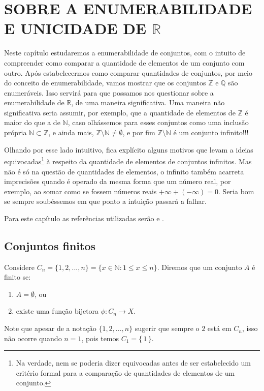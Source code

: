 \documentclass[../main.tex]{subfiles}
\makeatletter
\newcounter{saveenumerate}
\newcommand{\enumeratext}[1]{%
\setcounter{saveenumerate}{\value{enum\romannumeral\the\@enumdepth}}
\end{enumerate}
#1
\begin{enumerate}
\setcounter{enum\romannumeral\the\@enumdepth}{\value{saveenumerate}}%
}
\makeatother
\begin{document}
\chapter{SOBRE A ENUMERABILIDADE E UNICIDADE DE $\mathbb{R}$ }\label{cap-enumerabilidade}

Neste capítulo estudaremos a enumerabilidade de conjuntos, com o intuito de compreender como comparar a quantidade de elementos de um conjunto com outro. Após estabelecermos como comparar quantidades de conjuntos, por meio do conceito de enumerabilidade, vamos mostrar que os conjuntos $\mathbb{Z} $ e $ \mathbb{Q}$ são enumeráveis. Isso servirá para que possamos nos questionar sobre a enumerabilidade de $\mathbb{R}$, de uma maneira significativa. Uma maneira não significativa seria assumir, por exemplo, que a quantidade de elementos de $\mathbb{Z}$ é maior do que a de $\mathbb{N}$, caso olhássemos para esses conjuntos como uma inclusão própria $\mathbb{N} \subset \mathbb{Z}$, e ainda mais, $\mathbb{Z} \setminus \mathbb{N} \neq \emptyset$, e por fim $\mathbb{Z} \setminus \mathbb{N}$ é um conjunto infinito!!! 

Olhando por esse lado intuitivo, fica explícito alguns motivos que levam a ideias equivocadas\footnote{Na verdade, nem se poderia dizer equivocadas antes de ser estabelecido um critério formal para a comparação de quantidades de elementos de um conjunto.} à respeito da quantidade de elementos de conjuntos infinitos. Mas não é só na questão de quantidades de elementos, o infinito também acarreta imprecisões quando é operado da mesma forma que um número real, por exemplo, ao somar como se fossem números reais $+\infty + (-\infty) = 0 $. Seria bom se sempre soubéssemos em que ponto a intuição passará a falhar.

Para este capítulo as referências utilizadas serão \textcite{lima-analise-1} e \textcite{bartle}.


\section{Conjuntos finitos}
\begin{defi}\label{enum-def-conjuntoFinito}
    Considere $C_n = \{ 1, 2, ..., n \} = \{ x \in \mathbb{N} : 1 \leq x \leq n \}$. Diremos que um conjunto $A$ é finito se:
    \begin{enumerate}[label=(\roman*)]
        \item $A = \emptyset$, ou
        \item existe uma função bijetora $\phi \colon C_n \to X$.
    \end{enumerate}
\end{defi}
\begin{obs}
    Note que apesar de a notação $\{ 1,2,...,n \}$ sugerir que sempre o $2$ está em $C_n$, isso não ocorre quando $n=1$, pois temos $C_1 = \{\,1\,\}$.
\end{obs}
\end{document}
